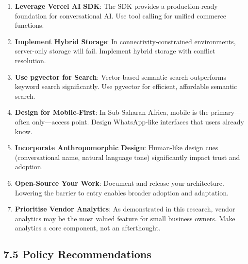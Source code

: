\documentclass[12pt,a4paper]{article}
\begin{document}
\begin{enumerate}
    \item \textbf{Leverage Vercel AI SDK}: The SDK provides a production-ready foundation for conversational AI. Use tool calling for unified commerce functions.
    \item \textbf{Implement Hybrid Storage}: In connectivity-constrained environments, server-only storage will fail. Implement hybrid storage with conflict resolution.
    \item \textbf{Use pgvector for Search}: Vector-based semantic search outperforms keyword search significantly. Use pgvector for efficient, affordable semantic search.
    \item \textbf{Design for Mobile-First}: In Sub-Saharan Africa, mobile is the primary---often only---access point. Design WhatsApp-like interfaces that users already know.
    \item \textbf{Incorporate Anthropomorphic Design}: Human-like design cues (conversational name, natural language tone) significantly impact trust and adoption.
    \item \textbf{Open-Source Your Work}: Document and release your architecture. Lowering the barrier to entry enables broader adoption and adaptation.
    \item \textbf{Prioritise Vendor Analytics}: As demonstrated in this research, vendor analytics may be the most valued feature for small business owners. Make analytics a core component, not an afterthought.
\end{enumerate}

\subsection{7.5 Policy Recommendations}
\end{document}
